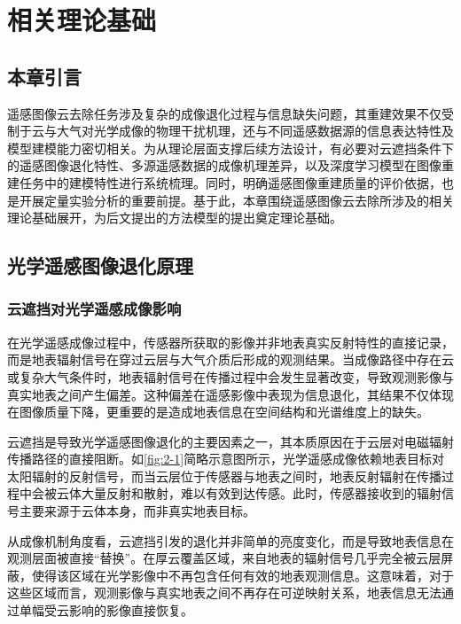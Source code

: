 


\chapter{相关理论基础}
\thispagestyle{others}
\pagestyle{others}
\xiaosi

\section{本章引言}

遥感图像云去除任务涉及复杂的成像退化过程与信息缺失问题，其重建效果不仅受制于云与大气对光学成像的物理干扰机理，还与不同遥感数据源的信息表达特性及模型建模能力密切相关。为从理论层面支撑后续方法设计，有必要对云遮挡条件下的遥感图像退化特性、多源遥感数据的成像机理差异，以及深度学习模型在图像重建任务中的建模特性进行系统梳理。同时，明确遥感图像重建质量的评价依据，也是开展定量实验分析的重要前提。基于此，本章围绕遥感图像云去除所涉及的相关理论基础展开，为后文提出的方法模型的提出奠定理论基础。

\section{光学遥感图像退化原理}

\subsection{云遮挡对光学遥感成像影响}

在光学遥感成像过程中，传感器所获取的影像并非地表真实反射特性的直接记录，而是地表辐射信号在穿过云层与大气介质后形成的观测结果。当成像路径中存在云或复杂大气条件时，地表辐射信号在传播过程中会发生显著改变，导致观测影像与真实地表之间产生偏差。这种偏差在遥感影像中表现为信息退化，其结果不仅体现在图像质量下降，更重要的是造成地表信息在空间结构和光谱维度上的缺失。

云遮挡是导致光学遥感图像退化的主要因素之一，其本质原因在于云层对电磁辐射传播路径的直接阻断。如\ref{fig:2-1}简略示意图所示，光学遥感成像依赖地表目标对太阳辐射的反射信号，而当云层位于传感器与地表之间时，地表反射辐射在传播过程中会被云体大量反射和散射，难以有效到达传感。此时，传感器接收到的辐射信号主要来源于云体本身，而非真实地表目标。

从成像机制角度看，云遮挡引发的退化并非简单的亮度变化，而是导致地表信息在观测层面被直接“替换”。在厚云覆盖区域，来自地表的辐射信号几乎完全被云层屏蔽，使得该区域在光学影像中不再包含任何有效的地表观测信息。这意味着，对于这些区域而言，观测影像与真实地表之间不再存在可逆映射关系，地表信息无法通过单幅受云影响的影像直接恢复。

